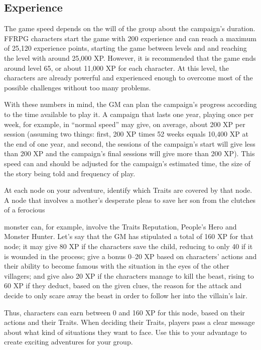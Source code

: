 \subsection{Experience}\label{subsec:gm-experience}
\begin{multicols}{2}
The game speed depends on the will of the group about the campaign’s duration. FFRPG characters start the game with 200 experience and can reach a maximum of 25,120 experience points, starting the game between levels  and  and reaching the  level with around 25,000 XP\@. However, it is recommended that the game ends around level 65, or about 11,000 XP for each character. At this level, the characters are already powerful and experienced enough to overcome most of the possible challenges without too many problems.

With these numbers in mind, the GM can plan the campaign’s progress according to the time available to play it. A campaign that lasts one year, playing once per week, for example, in “normal speed” may give, on average, about 200 XP per session (assuming two things: first, 200 XP times 52 weeks equals 10,400 XP at the end of one year, and second, the sessions of the campaign’s start will give less than 200 XP and the campaign’s final sessions will give more than 200 XP). This speed can and should be adjusted for the campaign’s estimated time, the size of the story being told and frequency of play.

At each node on your
adventure, identify which Traits
are covered by that node. A node
that involves a mother’s
desperate pleas to save her son
from the clutches of a ferocious

monster can, for example, involve the Traits Reputation, People’s Hero and Monster Hunter. Let's say that the GM has stipulated a total of 160 XP for that node; it may give 80 XP if the characters save the child, reducing to only 40 if it is wounded in the process; give a bonus 0--20 XP based on characters’ actions and their ability to become famous with the situation in the eyes of the other villagers; and give also 20 XP if the characters manage to kill the beast, rising to 60 XP if they deduct, based on the given clues, the reason for the attack and decide to only scare away the beast in order to follow her into the villain's lair.

Thus, characters can earn between 0 and 160 XP for this node, based on their actions and their Traits. When deciding their Traits, players pass a clear message about what kind of situations they want to face. Use this to your advantage to create exciting adventures for your group.


\end{multicols}
